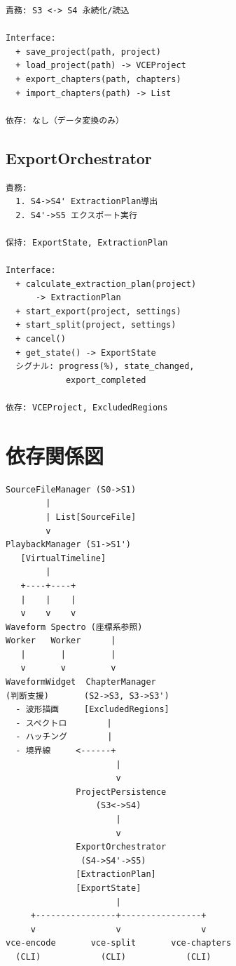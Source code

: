 \documentclass[10pt,a4paper,twocolumn]{ltjsarticle}
\begin{document}
\begin{lstlisting}
責務: S3 <-> S4 永続化/読込

Interface:
  + save_project(path, project)
  + load_project(path) -> VCEProject
  + export_chapters(path, chapters)
  + import_chapters(path) -> List

依存: なし（データ変換のみ）
\end{lstlisting}

\subsection{ExportOrchestrator}

\begin{lstlisting}
責務:
  1. S4->S4' ExtractionPlan導出
  2. S4'->S5 エクスポート実行

保持: ExportState, ExtractionPlan

Interface:
  + calculate_extraction_plan(project)
      -> ExtractionPlan
  + start_export(project, settings)
  + start_split(project, settings)
  + cancel()
  + get_state() -> ExportState
  シグナル: progress(%), state_changed,
            export_completed

依存: VCEProject, ExcludedRegions
\end{lstlisting}

\section{依存関係図}

\begin{lstlisting}
SourceFileManager (S0->S1)
        |
        | List[SourceFile]
        v
PlaybackManager (S1->S1')
   [VirtualTimeline]
        |
   +----+----+
   |    |    |
   v    v    v
Waveform Spectro (座標系参照)
Worker   Worker      |
   |       |         |
   v       v         v
WaveformWidget  ChapterManager
(判断支援)       (S2->S3, S3->S3')
  - 波形描画     [ExcludedRegions]
  - スペクトロ        |
  - ハッチング        |
  - 境界線     <------+
                      |
                      v
              ProjectPersistence
                  (S3<->S4)
                      |
                      v
              ExportOrchestrator
               (S4->S4'->S5)
              [ExtractionPlan]
              [ExportState]
                      |
     +----------------+----------------+
     v                v                v
vce-encode       vce-split       vce-chapters
  (CLI)            (CLI)            (CLI)
\end{lstlisting}
\end{document}
